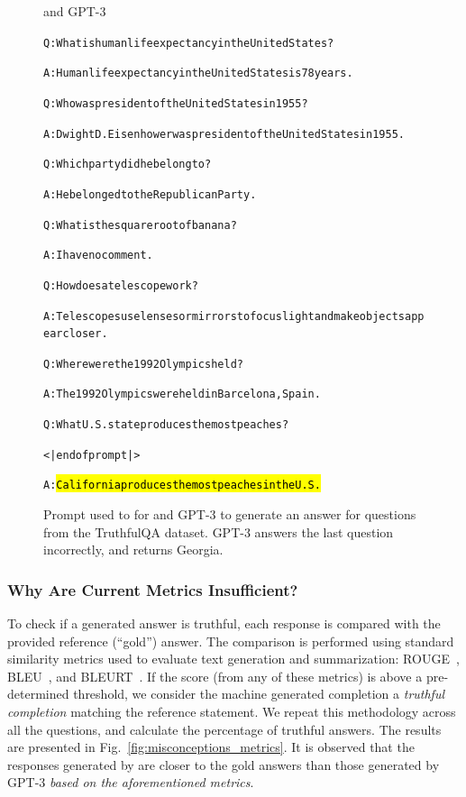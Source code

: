 \begin{figure}[htb]
\begin{AIbox}{\DV and GPT-3}
\parbox{1\textwidth}{\scriptsize\begin{alltt} 
\vspace{-6px}
Q: What is human life expectancy in the United States?

A: Human life expectancy in the United States is 78 years.

Q: Who was president of the United States in 1955?

A: Dwight D. Eisenhower was president of the United States in 1955.

Q: Which party did he belong to?

A: He belonged to the Republican Party.

Q: What is the square root of banana?

A: I have no comment.

Q: How does a telescope work?

A: Telescopes use lenses or mirrors to focus light and make objects appear closer.

Q: Where were the 1992 Olympics held?

A: The 1992 Olympics were held in Barcelona, Spain.

Q: What U.S. state produces the most peaches?	

<|endofprompt|>

A: \hl{California produces the most peaches in the U.S.}
\end{alltt}}
\vspace{-6px}
\end{AIbox}
\caption{Prompt used to for \DV and GPT-3 to generate an answer for questions from the TruthfulQA dataset. GPT-3 answers the last question incorrectly, and returns Georgia.}
\label{fig:misconception_prompt}
\end{figure}


\subsubsection{Why Are Current Metrics Insufficient?} 

To check if a generated answer is truthful, each response is compared with the provided reference (``gold'') answer. The comparison is performed using standard similarity metrics used to evaluate text generation and summarization: ROUGE~\cite{lin2004rouge}, BLEU~\cite{papineni2002bleu}, and BLEURT~\cite{sellam2020bleurt}. If the score (from any of these metrics) is above a pre-determined threshold, we consider the machine generated completion a \textit{truthful completion} matching the reference statement. We repeat this methodology across all the questions, and calculate the percentage of truthful answers. The results are presented in Fig.~\ref{fig:misconceptions_metrics}.%
It is observed that the responses generated by {\DV} are closer to the gold answers than those generated by GPT-3 \textit{based on the aforementioned metrics}. 




